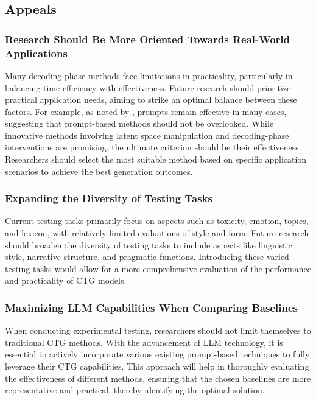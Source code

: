 \documentclass[acmsmall, screen]{acmart}
\begin{document}
\subsection{Appeals}

\subsubsection{\textbf{Research Should Be More Oriented Towards Real-World Applications}}
Many decoding-phase methods face limitations in practicality, particularly in balancing time efficiency with effectiveness. Future research should prioritize practical application needs, aiming to strike an optimal balance between these factors. For example, as noted by \cite{ashok_arxiv24_ConGenBench}, prompts remain effective in many cases, suggesting that prompt-based methods should not be overlooked. While innovative methods involving latent space manipulation and decoding-phase interventions are promising, the ultimate criterion should be their effectiveness. Researchers should select the most suitable method based on specific application scenarios to achieve the best generation outcomes.

\subsubsection{\textbf{Expanding the Diversity of Testing Tasks}}
Current testing tasks primarily focus on aspects such as toxicity, emotion, topics, and lexicon, with relatively limited evaluations of style and form. Future research should broaden the diversity of testing tasks to include aspects like linguistic style, narrative structure, and pragmatic functions. Introducing these varied testing tasks would allow for a more comprehensive evaluation of the performance and practicality of CTG models.

\subsubsection{\textbf{Maximizing LLM Capabilities When Comparing Baselines}}
When conducting experimental testing, researchers should not limit themselves to traditional CTG methods. With the advancement of LLM technology, it is essential to actively incorporate various existing prompt-based techniques to fully leverage their CTG capabilities. This approach will help in thoroughly evaluating the effectiveness of different methods, ensuring that the chosen baselines are more representative and practical, thereby identifying the optimal solution.
\end{document}
